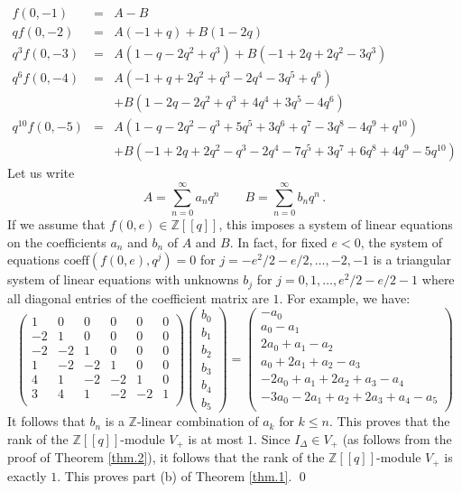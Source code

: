 \documentclass[12pt]{amsart}
\theoremstyle{definition}
\def\BZ{\mathbb Z}
\def\coeff{\mathrm{coeff}}
\def\ID{I_{\Delta}}
\numberwithin{equation}{section}
\begin{document}
\begin{eqnarray*}
f(0,-1)&=& A-B \\
q f(0,-2) &=&
A (-1+q) + B (1-2 q)
\\
q^3 f(0,-3) &=&
A \left(1-q-2 q^2+q^3\right) + B \left(-1+2 q+2 q^2-3 q^3\right)
\\
q^6 f(0,-4) &=&
A \left(-1+q+2 q^2+q^3-2 q^4-3 q^5+q^6\right) \\ & & 
+B \left(1-2 q-2 q^2+q^3+4 q^4+3 q^5-4 q^6\right)
\\
q^{10} f(0,-5) &=&
A \left(1-q-2 q^2-q^3+5 q^5+3 q^6+q^7-3 q^8-4 q^9+q^{10}\right) \\ & & 
+B \left(-1+2 q+2 q^2-q^3-2 q^4-7 q^5+3 q^7+6 q^8+4 q^9-5 q^{10}\right)
\end{eqnarray*}
Let us write
$$
A=\sum_{n=0}^\infty a_n q^n  \qquad
B=\sum_{n=0}^\infty b_n q^n \,.
$$
If we assume that $f(0,e) \in \BZ[[q]]$, this imposes a system of linear 
equations on the coefficients $a_n$ and $b_n$ of $A$ and $B$. In fact,
for fixed $e <0$, the system of equations $\coeff(f(0,e),q^j)=0$
for $j=-e^2/2-e/2, \dots, -2,-1$ is a triangular system
of linear equations with unknowns $b_j$ for $j=0,1,\dots,e^2/2-e/2-1$
where all diagonal entries of the coefficient matrix are $1$. For example,
we have:
$$
\left(
\begin{array}{cccccc}
 1 & 0 & 0 & 0 & 0 & 0 \\
 -2 & 1 & 0 & 0 & 0 & 0 \\
 -2 & -2 & 1 & 0 & 0 & 0 \\
 1 & -2 & -2 & 1 & 0 & 0 \\
 4 & 1 & -2 & -2 & 1 & 0 \\
 3 & 4 & 1 & -2 & -2 & 1 \\
\end{array}
\right) 
\left(
\begin{array}{c}
b_0 \\
b_1 \\
b_2 \\
b_3 \\
b_4 \\
b_5
\end{array}
\right)
=
\left(
\begin{array}{c}
 -a_{0} \\
 a_{0}-a_{1} \\
 2 a_{0}+a_{1}-a_{2} \\
 a_{0}+2 a_{1}+a_{2}-a_{3} \\
 -2 a_{0}+a_{1}+2 a_{2}+a_{3}-a_{4} \\
 -3 a_{0}-2 a_{1}+a_{2}+2 a_{3}+a_{4}-a_{5} \\
\end{array}
\right)
$$
It follows that $b_n$ is a $\BZ$-linear combination of $a_k$ for $k \leq n$.
This proves that the rank of the $\BZ[[q]]$-module $V_+$ is at most $1$.
Since $\ID \in V_+$ (as follows from the proof of Theorem \ref{thm.2}), it
follows that the rank of the $\BZ[[q]]$-module $V_+$ is exactly $1$.
This proves part (b) of Theorem \ref{thm.1}. 
\qed
\end{document}
